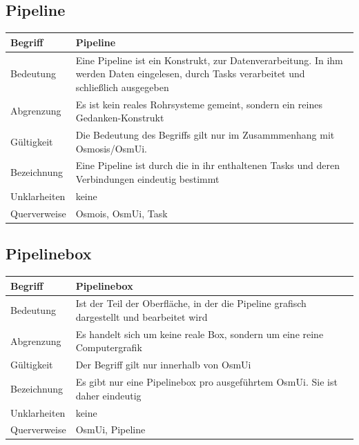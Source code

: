 \documentclass[a4paper,12pt]{scrartcl}
\begin{document}
\begin{center}
\subsection{Pipeline}
\begin{tabular}{|p{5cm}|p{10cm}|}
\hline Begriff & \textbf{Pipeline} \\ 
\hline Bedeutung & Eine Pipeline ist ein Konstrukt, zur Datenverarbeitung. In ihm werden Daten eingelesen, durch Tasks verarbeitet und schließlich ausgegeben\\ 
\hline Abgrenzung & Es ist kein reales Rohrsysteme gemeint, sondern ein reines Gedanken-Konstrukt \\ 
\hline Gültigkeit & Die Bedeutung des Begriffs gilt nur im Zusammmenhang mit Osmosis/OsmUi. \\ 
\hline Bezeichnung & Eine Pipeline ist durch die in ihr enthaltenen Tasks und deren Verbindungen eindeutig bestimmt \\ 
\hline Unklarheiten & keine \\ 
\hline Querverweise & Osmois, OsmUi, Task \\ 
\hline 
\end{tabular}
\subsection{Pipelinebox}
\begin{tabular}{|p{5cm}|p{10cm}|}
\hline Begriff & \textbf{Pipelinebox} \\ 
\hline Bedeutung & Ist der Teil der Oberfläche, in der die Pipeline grafisch dargestellt und bearbeitet wird \\ 
\hline Abgrenzung & Es handelt sich um keine reale Box, sondern um eine reine Computergrafik \\ 
\hline Gültigkeit & Der Begriff gilt nur innerhalb von OsmUi \\ 
\hline Bezeichnung & Es gibt nur eine Pipelinebox pro ausgeführtem OsmUi. Sie ist daher eindeutig \\ 
\hline Unklarheiten & keine \\ 
\hline Querverweise & OsmUi, Pipeline \\ 
\hline 
\end{tabular}

\end{center}
\end{document}
